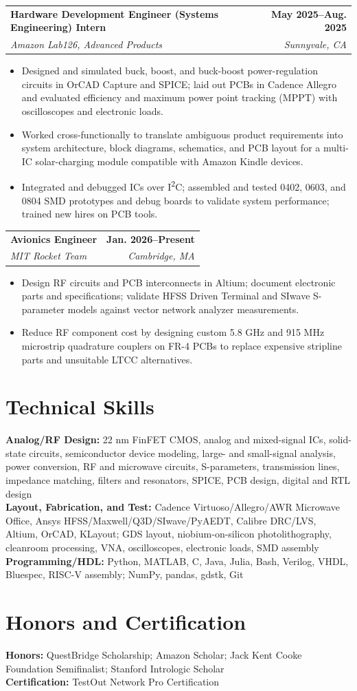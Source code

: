 \documentclass[10pt,letterpaper]{article}
\makeatletter
\newcommand{\role}[4]{%
  \begin{tabularx}{\textwidth}{@{}Xr@{}}
    \textbf{#1} & \textbf{#2} \\
    \textit{#3} & \textit{#4}
  \end{tabularx}\vspace{-4pt}
}
\makeatother
\begin{document}
\role{Hardware Development Engineer (Systems Engineering) Intern}{May 2025--Aug. 2025}{Amazon Lab126, Advanced Products}{Sunnyvale, CA}
\begin{itemize}
  \item Designed and simulated buck, boost, and buck-boost power-regulation circuits in OrCAD Capture and SPICE; laid out PCBs in Cadence Allegro and evaluated efficiency and maximum power point tracking (MPPT) with oscilloscopes and electronic loads.
  \item Worked cross-functionally to translate ambiguous product requirements into system architecture, block diagrams, schematics, and PCB layout for a multi-IC solar-charging module compatible with Amazon Kindle devices.
  \item Integrated and debugged ICs over I\textsuperscript{2}C; assembled and tested 0402, 0603, and 0804 SMD prototypes and debug boards to validate system performance; trained new hires on PCB tools.
\end{itemize}

\role{Avionics Engineer}{Jan. 2026--Present}{MIT Rocket Team}{Cambridge, MA}
\begin{itemize}
  \item Design RF circuits and PCB interconnects in Altium; document electronic parts and specifications; validate HFSS Driven Terminal and SIwave S-parameter models against vector network analyzer measurements.
  \item Reduce RF component cost by designing custom 5.8 GHz and 915 MHz microstrip quadrature couplers on FR-4 PCBs to replace expensive stripline parts and unsuitable LTCC alternatives.
\end{itemize}

\section{Technical Skills}
\textbf{Analog/RF Design:} 22 nm FinFET CMOS, analog and mixed-signal ICs, solid-state circuits, semiconductor device modeling, large- and small-signal analysis, power conversion, RF and microwave circuits, S-parameters, transmission lines, impedance matching, filters and resonators, SPICE, PCB design, digital and RTL design\\
\textbf{Layout, Fabrication, and Test:} Cadence Virtuoso/Allegro/AWR Microwave Office, Ansys HFSS/Maxwell/Q3D/SIwave/PyAEDT, Calibre DRC/LVS, Altium, OrCAD, KLayout; GDS layout, niobium-on-silicon photolithography, cleanroom processing, VNA, oscilloscopes, electronic loads, SMD assembly\\
\textbf{Programming/HDL:} Python, MATLAB, C, Java, Julia, Bash, Verilog, VHDL, Bluespec, RISC-V assembly; NumPy, pandas, gdstk, Git

\section{Honors and Certification}
\textbf{Honors:} QuestBridge Scholarship; Amazon Scholar; Jack Kent Cooke Foundation Semifinalist; Stanford Intrologic Scholar\\
\textbf{Certification:} TestOut Network Pro Certification
\end{document}
